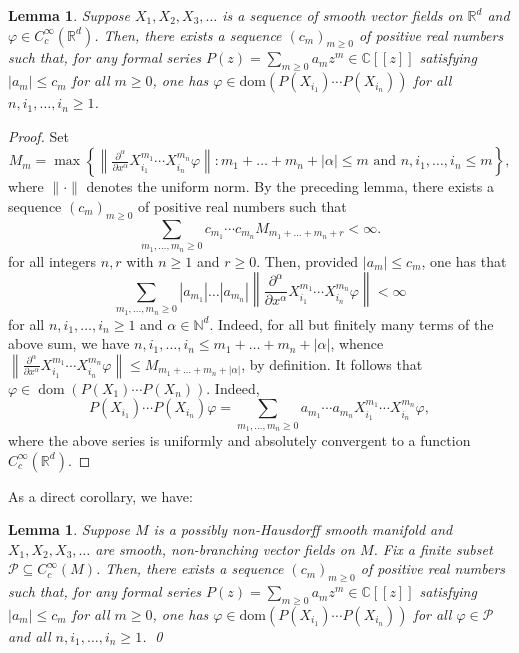 \documentclass[12pt]{article}
\theoremstyle{plain}
\newtheorem{lemma}[thm]{Lemma}
\theoremstyle{definition}
\newcommand{\R}{\mathbb{R}}
\newcommand{\C}{\mathbb{C}}
\newcommand{\dom}{\operatorname{dom}}
\numberwithin{equation}{section}
\begin{document}
\begin{lemma}
Suppose $X_1,X_2,X_3,\ldots$ is a sequence of smooth vector fields on $\R^d$ and  $\varphi \in C_c^\infty(\R^d)$.  Then, there exists a sequence $(c_m)_{ m \geq 0}$ of positive real numbers  such that, for any formal series $P(z) = \sum_{m \geq 0} a_m z^m \in \C[[z]]$ satisfying $|a_m|\leq c_m$ for all $m\geq0$, one has $\varphi \in \mathrm{dom}( P(X_{i_1}) \cdots P(X_{i_n}) )$ for all $n, i_1,\ldots,i_n \geq 1$.
\end{lemma}
\begin{proof}
Set
\[ M_m = \max \left\{ \left\| \tfrac{\partial^\alpha}{\partial x^\alpha} X_{i_1}^{m_1} \cdots X_{i_n}^{m_n} \varphi \right\| :  m_1+\ldots+m_n +|\alpha| \leq m \text{ and } n,i_1,\ldots,i_n   \leq m \right\}, \]
where $\|\cdot\|$ denotes the uniform norm. By the preceding lemma, there exists a sequence $(c_m)_{m \geq 0}$ of positive real numbers such that
\[ \sum_{m_1,\ldots,m_n \geq 0 } c_{m_1}\cdots c_{m_n} M_{m_1+\ldots+m_n+r} < \infty. \]
for all integers $n,r$ with $n \geq 1$ and $r \geq 0$. Then, provided $|a_m|\leq c_m$, one has that
\[ \sum_{m_1,\ldots,m_n \geq 0} |a_{m_1}| \ldots |a_{m_n}| \left\| \frac{\partial^\alpha}{\partial x^\alpha} X_{i_1}^{m_1} \cdots X_{i_n}^{m_n} \varphi \right\| < \infty \]
for all $n, i_1,\ldots,i_n \geq 1$ and  $\alpha \in \mathbb{N}^d$. Indeed, for all but finitely many terms of the above sum, we have $n,i_1,\ldots,i_n   \leq m_1+\ldots+m_n+ |\alpha|$, whence $\left\| \frac{\partial^\alpha}{\partial x^\alpha} X_{i_1}^{m_1} \cdots X_{i_n}^{m_n} \varphi \right\| \leq M_{m_1+\ldots+m_n+|\alpha|}$, by definition. It follows that $\varphi \in \dom(P(X_1) \cdots P(X_n))$. Indeed, 
\[ P(X_{i_1})\cdots P(X_{i_n})\varphi  = \sum_{m_1,\ldots,m_n \geq 0} a_{m_1}\cdots a_{m_n} X^{m_1}_{i_1} \cdots X^{m_n}_{i_n} \varphi, \]
where the above series is uniformly and absolutely convergent to a function $C_c^\infty(\R^d)$.
\end{proof}


As a direct corollary, we have:

\begin{lemma}\label{fast enough decay}
Suppose $M$ is a possibly non-Hausdorff smooth manifold and  $X_1,X_2,X_3,\ldots$ are smooth, non-branching vector fields on $M$. Fix a finite subset $\mathscr{P} \subseteq C_c^\infty(M)$. Then, there exists a sequence $(c_m)_{ m \geq 0}$ of positive real numbers  such that, for any formal series $P(z) = \sum_{m \geq 0} a_m z^m \in \C[[z]]$ satisfying $|a_m|\leq c_m$ for all $m\geq0$, one has $\varphi  \in \mathrm{dom}( P(X_{i_1}) \cdots P(X_{i_n}) )$ for all $\varphi \in \mathscr{P}$ and all $n, i_1,\ldots,i_n \geq 1$. \qed
\end{lemma}
\end{document}
